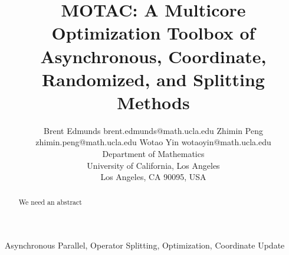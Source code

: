 \documentclass[twoside,11pt]{article}
\newcommand{\pkg}{{MOTAC}}
\begin{document}
\title{\pkg: A Multicore Optimization Toolbox of Asynchronous, Coordinate, Randomized, and Splitting Methods}

\author{\name Brent Edmunds \email brent.edmunds@math.ucla.edu
       \AND
       \name Zhimin Peng \email zhimin.peng@math.ucla.edu
       \AND
        \name Wotao Yin \email wotaoyin@math.ucla.edu \\
       \addr Department of Mathematics\\
       University of California, Los Angeles\\
       Los Angeles, CA 90095, USA}      

\maketitle

\begin{abstract}
We need an abstract
\end{abstract}

\begin{keywords}
Asynchronous Parallel, Operator Splitting, Optimization, Coordinate Update
\end{keywords}








% 

%

%

%


% 


% 

% 

% 





\end{document}
